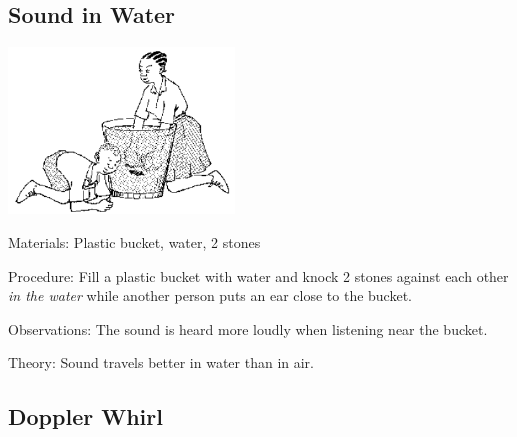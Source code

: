 \begin{multicols}{2}
\subsection{Sound in Water}

\begin{center}
\includegraphics[width=0.45\textwidth]{./img/source/sound-in-water.png}
\end{center}

\begin{description*}
\item[Materials:]{Plastic bucket, water, 2 stones}
\item[Procedure:]{Fill a plastic bucket with water and knock 2 stones against each other \emph{in the water} while another person puts an ear close to the bucket.}
\item[Observations:]{The sound is heard more loudly when listening near the bucket.}
\item[Theory:]{Sound travels better in water than in air.}
\end{description*}

\columnbreak

\subsection{Doppler Whirl}



\end{multicols}
